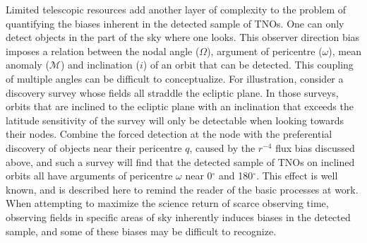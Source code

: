 \documentclass[preprint]{aastex62}
\begin{document}
Limited telescopic resources add another layer of complexity to the problem of quantifying the biases inherent in the detected sample of TNOs. One can only detect objects in the part of the sky where one looks.  This observer direction bias imposes a relation between the nodal angle ($\Omega$), argument of pericentre ($\omega$), mean anomaly ($\mathcal{M}$) and inclination ($i$) of an orbit that can be detected.  This coupling of multiple angles can be difficult to conceptualize.  For illustration, consider a discovery survey whose fields all straddle the ecliptic plane.  In those surveys,  orbits that are inclined to the ecliptic plane with an inclination that exceeds the latitude sensitivity of the survey will only be detectable when looking towards their nodes. Combine the forced detection at the node with the preferential discovery of objects near their pericentre $q$, caused by the $r^{-4}$ flux bias discussed above, and such a survey will find that the detected sample of TNOs on inclined orbits all have arguments of pericentre $\omega$ near 0$^{\circ}$ and 180$^{\circ}$. This effect is well known, and is described here to remind the reader of the basic processes at work.  When attempting to maximize the science return of scarce observing time, observing fields in specific areas of sky inherently induces biases in the detected sample, and some of these biases may be difficult to recognize. 
\end{document}
